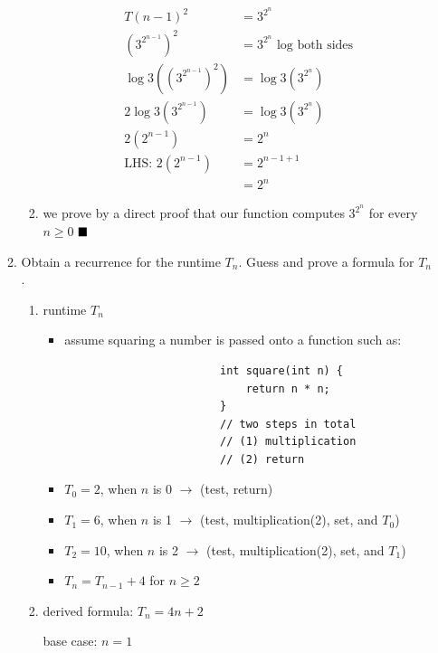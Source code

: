 \documentclass{article}
\begin{document}
\begin{itemize}
\begin{enumerate}[label=(\alph*)]
\begin{enumerate}[label=(\roman*)]
\begin{align*}
                    T(n-1)^2 &= 3^{2^n}\\
                    (3^{2^{n-1}})^2 &= 3^{2^n} \text{ log both sides}\\
                    \log{3}((3^{2^{n-1}})^2) &= \log{3}(3^{2^n})\\
                    2\log{3}(3^{2^{n-1}}) &= \log{3}(3^{2^n})\\
                    2(2^{n-1}) &= 2^n\\
                    \text{LHS: } 2(2^{n-1}) &= 2^{n-1+1}\\
                    &= 2^n
                \end{align*}
                \item we prove by a direct proof that our function computes $3^{2^n}$ for every $n \geq 0$ $\hfill\blacksquare$
            \end{enumerate}
            \item Obtain a recurrence for the runtime $T_n$. Guess and prove a formula for $T_n$.
            \begin{enumerate}[label=(\roman*)]
                \item runtime $T_n$
                \begin{itemize}[label=$\bullet$]
                    \item assume squaring a number is passed onto a function such as:
                    \begin{verbatim}
                        int square(int n) {
                            return n * n;
                        }
                        // two steps in total 
                        // (1) multiplication 
                        // (2) return
                    \end{verbatim}
                    \item $T_0 = 2$, when $n$ is 0 $\rightarrow$ (test, return)
                    \item $T_1 = 6$, when $n$ is 1 $\rightarrow$ (test, multiplication(2), set, and $T_0$)
                    \item $T_2 = 10$, when $n$ is 2 $\rightarrow$ (test, multiplication(2), set, and $T_1$)
                    \item $T_n = T_{n-1} + 4$ for $n \geq 2$ 
                \end{itemize}
                \item derived formula: $T_n = 4n + 2$
                \begin{center}
                    base case: $n=1$

\end{center}
\end{enumerate}
\end{enumerate}
\end{itemize}
\end{document}
